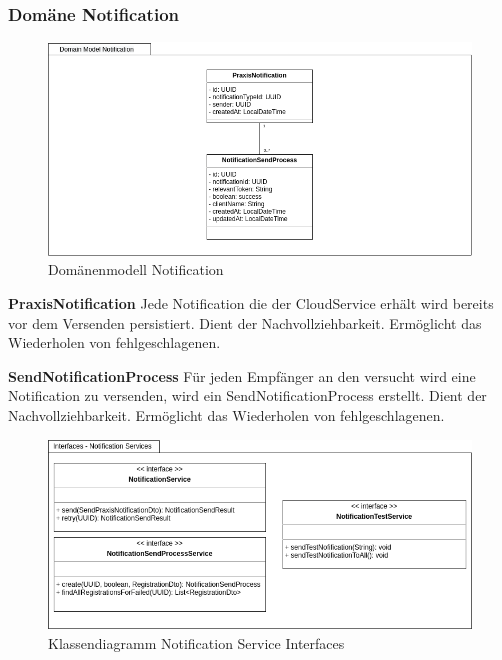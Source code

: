\clearpage
\subsubsection{Domäne Notification}

\begin{figure}[h]
    \centering
    \begin{minipage}[b]{1.0\textwidth}
        \includegraphics[width=\textwidth]{graphics/Class_Notification_Domain}
        \caption{Domänenmodell Notification}
    \end{minipage}
\end{figure}

\textbf{PraxisNotification}
Jede Notification die der CloudService erhält wird bereits vor dem Versenden persistiert.
Dient der Nachvollziehbarkeit.
Ermöglicht das Wiederholen von fehlgeschlagenen.

\textbf{SendNotificationProcess}
Für jeden Empfänger an den versucht wird eine Notification zu versenden, wird ein SendNotificationProcess erstellt.
Dient der Nachvollziehbarkeit.
Ermöglicht das Wiederholen von fehlgeschlagenen.

\begin{figure}[h]
    \centering
    \begin{minipage}[b]{0.9\textwidth}
        \includegraphics[width=\textwidth]{graphics/Class_Notification_Services}
        \caption{Klassendiagramm Notification Service Interfaces}
    \end{minipage}
\end{figure}

